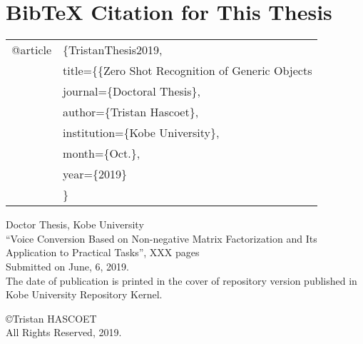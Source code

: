 

\chapter{BibTeX Citation for This Thesis } %
\label{Bibtex}
\begin{tabular}{  l  l   }
\hspace{1mm} @article&\{TristanThesis2019,\\
  & \hspace{1mm} title=\{\{Zero Shot Recognition of Generic Objects \\
  & \hspace{1mm} journal=\{Doctoral Thesis\},\\
  & \hspace{1mm} author=\{Tristan Hascoet\},\\
  & \hspace{1mm} institution=\{Kobe University\},\\
  & \hspace{1mm} month=\{Oct.\}, \\
  &\hspace{1mm}  year=\{2019\}\\
  & \}\\
\end{tabular}

\newpage
\label{colophon}
\noindent
Doctor Thesis, Kobe University\\
``Voice Conversion Based on Non-negative Matrix Factorization and Its Application to Practical Tasks'', XXX pages\\
Submitted on June, 6, 2019.\\
The date of publication is printed in the cover of repository version published in Kobe University Repository Kernel.\\
\begin{flushright}
\copyright Tristan HASCOET \\
All Rights Reserved, 2019.
\end{flushright}
\thispagestyle{empty}





